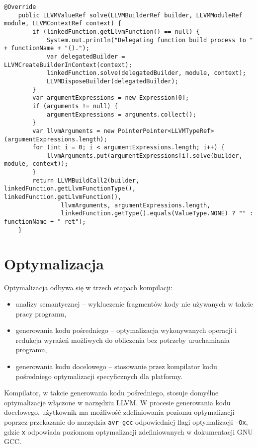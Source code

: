 \begin{lstlisting}[caption={Metoda solve(LLVMBuilderRef builder, LLVMModuleRef module, LLVMContextRef context) klasy FunctionCallExpression}, label={lst:ir-solve}]
    @Override
    public LLVMValueRef solve(LLVMBuilderRef builder, LLVMModuleRef module, LLVMContextRef context) {
        if (linkedFunction.getLlvmFunction() == null) {
            System.out.println("Delegating function build process to " + functionName + "().");
            var delegatedBuilder = LLVMCreateBuilderInContext(context);
            linkedFunction.solve(delegatedBuilder, module, context);
            LLVMDisposeBuilder(delegatedBuilder);
        }
        var argumentExpressions = new Expression[0];
        if (arguments != null) {
            argumentExpressions = arguments.collect();
        }
        var llvmArguments = new PointerPointer<LLVMTypeRef>(argumentExpressions.length);
        for (int i = 0; i < argumentExpressions.length; i++) {
            llvmArguments.put(argumentExpressions[i].solve(builder, module, context));
        }
        return LLVMBuildCall2(builder, linkedFunction.getLlvmFunctionType(), linkedFunction.getLlvmFunction(),
                llvmArguments, argumentExpressions.length,
                linkedFunction.getType().equals(ValueType.NONE) ? "" : functionName + "_ret");
    }
\end{lstlisting}

\section{Optymalizacja}
Optymalizacja odbywa się w trzech etapach kompilacji:
\begin{itemize}
\item analizy semantycznej -- wykluczenie fragmentów kody nie używanych w takcie pracy programu,
\item generowania kodu pośredniego -- optymalizacja wykonywanych operacji i redukcja wyrażeń możliwych do obliczenia bez potrzeby uruchamiania programu,
\item generowania kodu docelowego -- stosowanie przez kompilator kodu pośredniego optymalizacji specyficznych dla platformy.
\end{itemize}
Kompilator, w takcie generowania kodu pośredniego, stosuje domyślne optymalizacje włączone w narzędziu LLVM. W procesie generowania kodu docelowego, użytkownik ma możliwość zdefiniowania poziomu optymalizacji poprzez przekazanie do narzędzia \lstinline|avr-gcc| odpowiedniej flagi optymalizacji \lstinline|-Ox|, gdzie \lstinline|x| odpowiada poziomom optymalizacji zdefiniowanych w dokumentacji GNU GCC.

